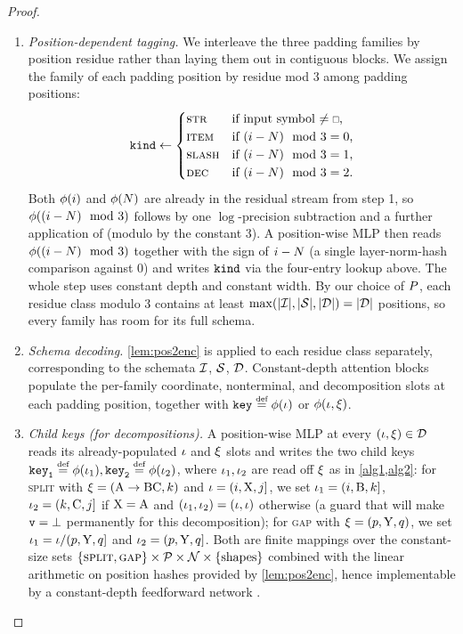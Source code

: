 \documentclass{article}
\begin{document}
\begin{proof}
\begin{enumerate}[noitemsep,topsep=0pt,leftmargin=18pt,parsep=0pt]
        \item \emph{Position-dependent tagging.} 
        We interleave the three padding families by position residue rather than laying them out in contiguous blocks. 
        We assign the family of each padding position by residue mod 3 among padding positions:
        \begin{equation*}
            \ftokenkind \gets \begin{cases} \textsc{str} & \text{if input symbol $\neq \paddingtoken$,} \\ \textsc{item} & \text{if $(\idxi-\idxn)\mod3=0$,} \\ \textsc{slash} & \text{if $(\idxi-\idxn)\mod3=1$,} \\ \textsc{dec} & \text{if $(\idxi-\idxn)\mod3=2$.} \end{cases}
        \end{equation*}
        Both $\phi({{ i}})$ and $\phi({{ N}})$ are already in the residual stream from step 1, so $\phi(({{ i}}-{{ N}})\mod3)$ follows by one $\log$-precision subtraction and a further application of \citet[Lem.~1]{merrill-2025littledepthgoeslong}  (modulo by the constant 3). A position-wise MLP then reads $\phi(({{ i}}-{{ N}})\mod3)$ together with the sign of ${{ i}}-{{ N}}$ (a single layer-norm-hash comparison against 0) and writes ${\mathtt{kind}}$ via the four-entry lookup above. The whole step uses constant depth and constant width.
        By our choice of ${P}$, each residue class modulo 3 contains at least $\max(|{{\mathcal{I}}}|,|{{\mathcal{S}}}|,|{{\mathcal{D}}}|)=|{{\mathcal{D}}}|$ positions, so every family has room for its full schema.
        \item \emph{Schema decoding.} \cref{lem:pos2enc} is applied to each residue class separately, corresponding to the schemata ${{\mathcal{I}}}$, ${{\mathcal{S}}}$, ${{\mathcal{D}}}$.
        Constant-depth attention blocks populate the per-family coordinate, nonterminal, and decomposition slots at each padding position, together with $\fkeyself \defeq \phi(\itm)$ or $\phi({{ \iota}}, {{\xi}})$.
        \item \emph{Child keys (for decompositions).} A position-wise MLP at every $({{ \iota}}, {{\xi}}) \in {{\mathcal{D}}}$ reads its already-populated ${{ \iota}}$ and ${{\xi}}$ slots and writes the two child keys $\fkeychildone \defeq \phi(\itm_1), \fkeychildtwo \defeq \phi(\itm_2)$, where ${{ \iota}}_1, {{ \iota}}_2$ are read off ${{\xi}}$ as in \cref{alg1,alg2}: for \textsc{split} with ${{\xi}} = ({{ {{ \mathrm{A}}} \rightarrow {{ \mathrm{B}}}{{ \mathrm{C}}}}}, {{ k}})$ and ${{ \iota}} = ({{ i}}, {{ \mathrm{X}}}, {{ j}}]$, we set ${{ \iota}}_1 = ({{ i}}, {{ \mathrm{B}}}, {{ k}}]$, ${{ \iota}}_2 = ({{ k}}, {{ \mathrm{C}}}, {{ j}}]$ if ${{ \mathrm{X}}} = {{ \mathrm{A}}}$ and $({{ \iota}}_1, {{ \iota}}_2) = ({{ \iota}}, {{ \iota}})$ otherwise (a guard that will make ${\mathtt{v}} = \bot$ permanently for this decomposition); for \textsc{gap} with ${{\xi}} = (p, {{ \mathrm{Y}}}, q)$, we set ${{ \iota}}_1 = {{ \iota}} / (p, {{ \mathrm{Y}}}, q]$ and ${{ \iota}}_2 = (p, {{ \mathrm{Y}}}, q]$. Both are finite mappings over the constant-size sets ${{\{ \textsc{split}, \textsc{gap} \}}} \times {{ \mathcal{P}}} \times {{ \mathcal{N}}} \times {{\{ \text{shapes} \}}}$ combined with the linear arithmetic on position hashes provided by \cref{lem:pos2enc}, hence implementable by a constant-depth feedforward network \citep{yang2025transformercookbook}.

\end{enumerate}
\end{proof}
\end{document}
